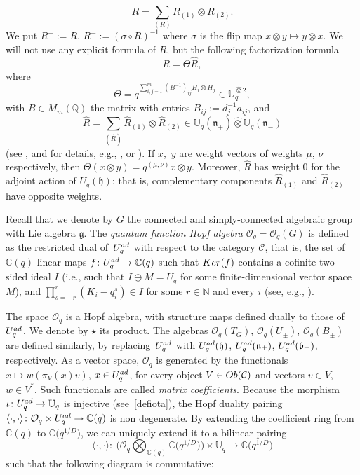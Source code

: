 \documentclass[11pt]{article}
\numberwithin{equation}{section}
\numberwithin{equation}{section}
\theoremstyle{definition}
\newcommand{\Oq}{\Oo_{q}}
\newcommand{\mUq}{\mathbb{U}_q}
\newcommand{\mc}{\mathbb{C}}
\newcommand{\Oo}{{\mathcal O}}
\newcommand{\ra}{\rightarrow}
\begin{document}
\begin{equation}\label{Rcat}
R=\sum_{(R)}R_{(1)}\otimes R_{(2)}.
\end{equation}
We put $R^+:=R$, $R^- := (\sigma\circ R)^{-1}$ where $\sigma$ is the flip map $x\otimes y \mapsto y\otimes x$. We will not use any explicit formula of $R$, but the following factorization formula
\begin{equation}\label{Rmatfact}
R=\Theta \hat{R},
\end{equation}
where
\[\Theta = q^{\sum_{i,j=1}^m (B^{-1})_{ij} H_i\otimes H_j} \in \mUq^{\hat{\otimes} 2},\]
with $B\in M_m(\mathbb{Q})$ the matrix with entries $B_{ij}:=d_j^{-1}a_{ij}$, and
\[\hat{R}=\sum_{(\hat{R})} \hat{R}_{(1)} \otimes \hat{R}_{(2)}\in \mUq(\mathfrak{n}_+)\hat{\otimes} \mUq(\mathfrak{n}_-)\]
(see \cite[Section 3.2]{BR}, and for details, e.g., \cite[Theorem 8.3.9]{CP}, or \cite[Theorem 3.108]{VY}). If $x$,~$y$ are weight vectors of weights $\mu$, $\nu$ respectively, then $\Theta(x\otimes y) = q^{(\mu,\nu)} x\otimes y$. Moreover, $\hat{R}$ has weight $0$ for the adjoint action of $U_q(\mathfrak{h})$; that is, complementary components $\hat{R}_{(1)}$ and $\hat{R}_{(2)}$ have opposite weights.


Recall that we denote by $G$ the connected and simply-connected algebraic group with Lie algebra $\mathfrak{g}$. The {\it quantum function Hopf algebra} $\Oo_q=\Oo_q(G)$ is defined as the restricted dual of~$U_q^{\rm ad}$ with respect to the category $\mathcal{C}$, that is, the set of ${\mathbb C}(q)$-linear maps $f\colon U_q^{\rm ad}\ra \mc(q)$ such that ${\rm Ker}(f)$ contains a cofinite two sided ideal $I$ (i.e., such that $I\oplus M =U_q$ for some finite-dimensional vector space $M$), and $ \prod_{s=-r}^r (K_i - q_i^s) \in I$ for some $r\in \mathbb{N}$ and every $i$ (see, e.g., \cite[Chapter I.7]{BG}).

The space $\Oo_q$ is a Hopf algebra, with structure maps defined dually to those of $U_q^{\rm ad}$. We denote by $\star$ its product. The algebras $\Oo_q(T_G)$, $\Oo_q(U_\pm)$, $\Oo_q(B_\pm)$ are defined similarly, by replacing~$U_q^{\rm ad}$ with $U_q^{\rm ad}(\mathfrak{h})$, $U_q^{\rm ad}(\mathfrak{n}_\pm)$, $U_q^{\rm ad}(\mathfrak{b}_\pm)$, respectively. As a vector space, $\Oq$ is generated by the functionals $x\mapsto w(\pi_V(x)v)$, $x\in U_q^{\rm ad}$, for every object $V\in {\rm Ob}(\mathcal{C})$ and vectors $v\in V$, $w\in V^*$. Such functionals are called {\it matrix coefficients}. Because the morphism $\iota\colon U_q^{\rm ad}\to \mathbb{U}_q$ is injective (see~\eqref{defiota}), the Hopf duality pairing $\langle\cdot,\cdot\rangle \colon \Oq \times U_q^{\rm ad} \ra \mc(q)$ is non degenerate. By extending the coefficient ring from $\mc(q)$ to $\mc\big(q^{1/D}\big)$, we can uniquely extend it to a bilinear pairing
\[\langle\cdot,\cdot\rangle\colon\ \big(\Oq \bigotimes_{{\mathbb C}(q)} {\mathbb C}\big(q^{1/D}\big)\big)\times \mUq \ra \mc\big(q^{1/D}\big)\]
such that the following diagram is commutative:
\end{document}
